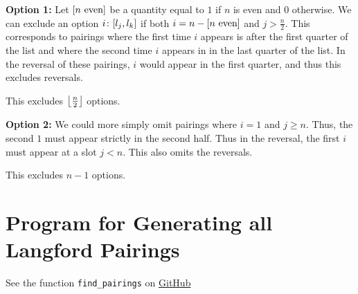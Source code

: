 \documentclass[letterpaper]{article}
\begin{document}
\textbf{Option 1:}
Let $\bqty{n \text{ even}}$ be a quantity equal to $1$ if $n$ is even and $0$ otherwise.
We can exclude an option $i\colon \bqty{l_{j}, l_{k}}$ if both $i = n - \bqty{n \text{ even}}$ and $j > \frac{n}{2}$.
This corresponds to pairings where the first time $i$ appears is after the first quarter of the list and where the second time $i$ appears in in the last quarter of the list.
In the reversal of these pairings, $i$ would appear in the first quarter, and thus this excludes reversals.

This excludes $\left\lfloor \frac{n}{2} \right\rfloor$ options.

\textbf{Option 2:}
We could more simply omit pairings where $i = 1$ and $j \geq n$.
Thus, the second $1$ must appear strictly in the second half.
Thus in the reversal, the first $i$ must appear at a slot $j < n$.
This also omits the reversals.

This excludes $n - 1$ options.

\section*{Program for Generating all Langford Pairings}

See the function \texttt{find\_pairings} on \href{https://github.com/SIGma-UIUC/meetings/blob/main/SP23/3-langford/langford_pairing.py}{GitHub}

\printbibliography
\end{document}
